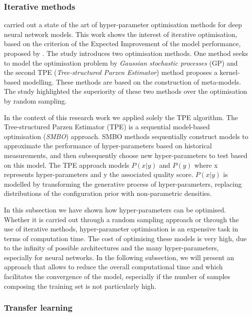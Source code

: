 \subsubsection{Iterative methods} \label{Iterative methods}

\citet{bergstra2011algorithms} carried out a state of the art of hyper-parameter optimisation methods for deep neural network models. This work shows the interest of iterative optimisation, based on the criterion of the Expected Improvement of the model performance, proposed by \citep{jones2001taxonomy}. The study introduces two optimisation methods. One method seeks to model the optimisation problem by \textit{Gaussian stochastic processes} (GP) and the second TPE (\textit{Tree-structured Parzen Estimator}) method proposes a kernel-based modelling. These methods are based on the construction of meta-models. The study highlighted the superiority of these two methods over the optimisation by random sampling. 

In the context of this research work we applied solely the TPE algorithm. The Tree-structured Parzen Estimator (TPE) is a sequential model-based optimisation (\textit{SMBO}) approach. SMBO methods sequentially construct models to approximate the performance of hyper-parameters based on historical measurements, and then subsequently choose new hyper-parameters to test based on this model. The TPE approach models $P(x|y)$ and $P(y)$ where x represents hyper-parameters and y the associated quality score. $P(x|y)$ is modelled by transforming the generative process of hyper-parameters, replacing distributions of the configuration prior with non-parametric densities.

In this subsection we have shown how hyper-parameters can be optimised. Whether it is carried out through a random sampling approach or through the use of iterative methods, hyper-parameter optimisation is an expensive task in terms of computation time. The cost of optimising these models is very high, due to the infinity of possible architectures and the many hyper-parameters, especially for neural networks. In the following subsection, we will present an approach that allows to reduce the overall computational time and which facilitates the convergence of the model, especially if the number of samples composing the training set is not particularly high.


\subsubsection{Transfer learning} \label{Transfer Learning}

